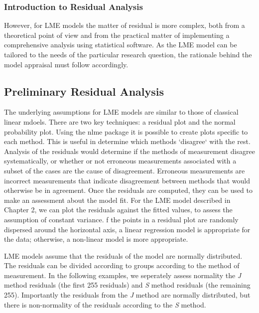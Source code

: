 \documentclass[12pt, a4paper]{report}
\theoremstyle{plain}
\theoremstyle{definition}
\theoremstyle{remark}
\begin{document}
	\subsubsection{Introduction to Residual Analysis}
However, for LME models the matter of residual is more complex, both from a theoretical point of view and from the practical matter of implementing a comprehensive analysis using statistical software. As the LME model can be tailored to the needs of the particular research question, the rationale behind the model appraisal must follow accordingly.
	
	
	
	\subsection*{Preliminary Residual Analysis }
	
The underlying assumptions for LME models are similar to those of classical linear mdoels. There are two key techniques: a residual plot and the normal probability plot. Using the nlme package it is possible to create plots specific to each method. This is useful in determine which methods `disagree` with the rest.
	Analysis of the residuals would determine if the methods of measurement disagree systematically, or whether or not erroneous measurements associated with a subset of the cases are the cause of disagreement.
	Erroneous measurements are incorrect measurements that indicate disagreement between methods that would otherwise be in agreement.
Once the residuals are computed, they can be used to make an assessment about the model fit. For the LME model described in Chapter 2, we can plot the residuals against the fitted values, to assess the assumption of constant variance. f the points in a residual plot are randomly dispersed around the horizontal axis, a linear regression model is appropriate for the data; otherwise, a non-linear model is more appropriate.
	
	
LME models assume that the residuals of the model are normally distributed.  The residuals can be divided according to groups according to the method of measurement. In the following examples, we seperately assess normality the \textit{J} method residuals (the first 255 residuals) and \textit{S} method residuals (the remaining 255). Importantly the residuals from the \textit{J} method are normally distributed, but there is non-normality of the residuals according to the \textit{S} method.
	
\end{document}
